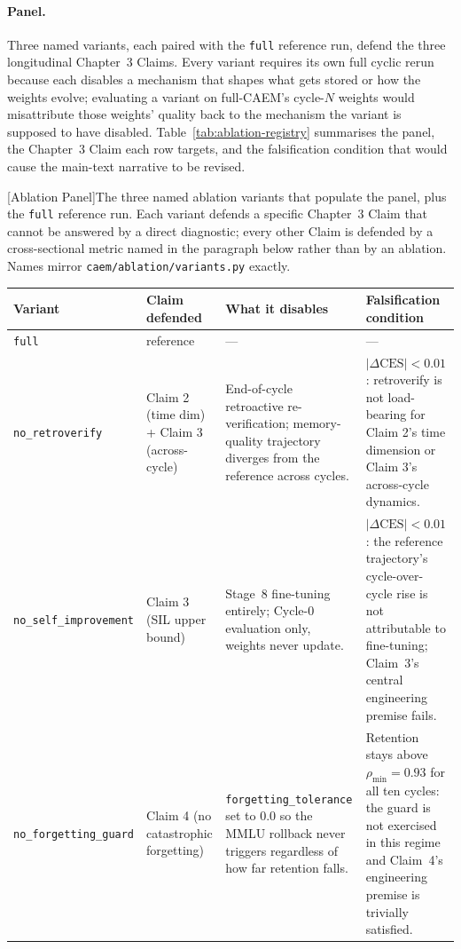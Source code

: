 \paragraph{Panel.}
Three named variants, each paired with the \texttt{full} reference run, defend the three longitudinal Chapter~3 Claims. Every variant requires its own full cyclic rerun because each disables a mechanism that shapes what gets stored or how the weights evolve; evaluating a variant on full-CAEM's cycle-$N$ weights would misattribute those weights' quality back to the mechanism the variant is supposed to have disabled. Table~\ref{tab:ablation-registry} summarises the panel, the Chapter~3 Claim each row targets, and the falsification condition that would cause the main-text narrative to be revised.

\begin{center}
[Ablation Panel]{The three named ablation variants that populate the panel, plus the \texttt{full} reference run. Each variant defends a specific Chapter~3 Claim that cannot be answered by a direct diagnostic; every other Claim is defended by a cross-sectional metric named in the paragraph below rather than by an ablation. Names mirror \texttt{caem/ablation/variants.py} exactly.}
\label{tab:ablation-registry}
\renewcommand{\arraystretch}{1.35}
\small
\begin{tabular}{@{}p{3.1cm} p{2.3cm} p{3.8cm} p{4.8cm}@{}}
\toprule
\textbf{Variant} & \textbf{Claim defended} & \textbf{What it disables} & \textbf{Falsification condition} \\
\midrule
\texttt{full} & reference & --- & --- \\
\addlinespace[2pt]
\texttt{no\_retroverify} & Claim 2 (time dim) + Claim 3 (across-cycle) & End-of-cycle retroactive re-verification; memory-quality trajectory diverges from the reference across cycles. & $|\Delta\text{CES}| < 0.01$: retroverify is not load-bearing for Claim 2's time dimension or Claim 3's across-cycle dynamics. \\
\addlinespace[2pt]
\texttt{no\_self\_improvement} & Claim 3 (SIL upper bound) & Stage~8 fine-tuning entirely; Cycle-0 evaluation only, weights never update. & $|\Delta\text{CES}| < 0.01$: the reference trajectory's cycle-over-cycle rise is not attributable to fine-tuning; Claim~3's central engineering premise fails. \\
\addlinespace[2pt]
\texttt{no\_forgetting\_guard} & Claim 4 (no catastrophic forgetting) & \texttt{forgetting\_tolerance} set to $0.0$ so the MMLU rollback never triggers regardless of how far retention falls. & Retention stays above $\rho_{\min} = 0.93$ for all ten cycles: the guard is not exercised in this regime and Claim~4's engineering premise is trivially satisfied. \\
\bottomrule
\end{tabular}
\end{center}

